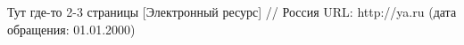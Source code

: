 \begingroup 
\renewcommand{\section}[2]{\anonsection{Библиографический список}}
\begin{thebibliography}{00}

    Тут где-то 2-3 страницы
    [Электронный ресурс] //
    Россия
    URL: http://ya.ru
    (дата обращения: 01.01.2000)

\end{thebibliography}
\endgroup

\clearpage
